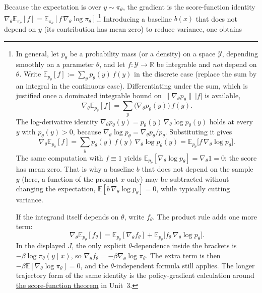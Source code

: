 \documentclass[11pt,a4paper]{article}
\newcommand{\jump}[2]{\hyperref[#1]{#2}}
\theoremstyle{definition}
\begin{document}
Because the expectation is over \(y\sim\pi_\theta\), the gradient is the score-function identity \(\nabla_\theta\mathbb{E}_{\pi_\theta}[f]=\mathbb{E}_{\pi_\theta}[f\,\nabla_\theta\log\pi_\theta]\).\footnote{In general, let \(p_\theta\) be a probability mass (or a density) on a space \(\mathcal{Y}\), depending smoothly on a parameter \(\theta\), and let \(f:\mathcal{Y}\to\mathbb{R}\) be integrable and \emph{not} depend on \(\theta\). Write \(\mathbb{E}_{p_\theta}[f]:=\sum_{y}p_\theta(y)\,f(y)\) in the discrete case (replace the sum by an integral in the continuous case). Differentiating under the sum, which is justified once a dominated integrable bound on \(\|\nabla_\theta p_\theta\|\,|f|\) is available,
\[
\nabla_\theta\mathbb{E}_{p_\theta}[f]
=\sum_y\bigl(\nabla_\theta p_\theta(y)\bigr)\,f(y).
\]
The log-derivative identity \(\nabla_\theta p_\theta(y)=p_\theta(y)\,\nabla_\theta\log p_\theta(y)\) holds at every \(y\) with \(p_\theta(y)>0\), because \(\nabla_\theta\log p_\theta=\nabla_\theta p_\theta/p_\theta\). Substituting it gives
\[
\nabla_\theta\mathbb{E}_{p_\theta}[f]
=\sum_y p_\theta(y)\,f(y)\,\nabla_\theta\log p_\theta(y)
=\mathbb{E}_{p_\theta}\bigl[f\,\nabla_\theta\log p_\theta\bigr].
\]
The same computation with \(f\equiv 1\) yields \(\mathbb{E}_{p_\theta}[\nabla_\theta\log p_\theta]=\nabla_\theta 1=0\): the score has mean zero. That is why a baseline \(b\) that does not depend on the sample \(y\) (here, a function of the prompt \(x\) only) may be subtracted without changing the expectation, \(\mathbb{E}[b\,\nabla_\theta\log p_\theta]=0\), while typically cutting variance.

If the integrand itself depends on \(\theta\), write \(f_\theta\). The product rule adds one more term:
\[
\nabla_\theta\mathbb{E}_{p_\theta}[f_\theta]
=\mathbb{E}_{p_\theta}[\nabla_\theta f_\theta]
+\mathbb{E}_{p_\theta}\bigl[f_\theta\,\nabla_\theta\log p_\theta\bigr].
\]
In the displayed \(J\), the only explicit \(\theta\)-dependence inside the brackets is \(-\beta\log\pi_\theta(y\mid x)\), so \(\nabla_\theta f_\theta=-\beta\nabla_\theta\log\pi_\theta\). The extra term is then \(-\beta\mathbb{E}[\nabla_\theta\log\pi_\theta]=0\), and the \(\theta\)-independent formula still applies. The longer trajectory form of the same identity is the policy-gradient calculation around \jump{eq:policy-gradient}{the score-function theorem} in Unit~3.} Introducing a baseline \(b(x)\) that does not depend on \(y\) (its contribution has mean zero) to reduce variance, one obtains
\end{document}
